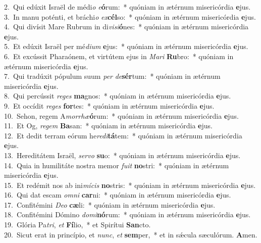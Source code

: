 {2.~}Qui edúxit Israël de médi\textit{o} \textit{e}\textbf{ó}rum:~* quóniam in ætérnum misericórdia \textbf{e}jus.\\
{3.~}In manu poténti, et bráchi\textit{o} \textit{ex}\textbf{cél}so:~* quóniam in ætérnum misericórdia \textbf{e}jus.\\
{4.~}Qui divísit Mare Rubrum in di\textit{vi}\textit{si}\textbf{ó}nes:~* quóniam in ætérnum misericórdia \textbf{e}jus.\\
{5.~}Et edúxit Israël per mé\textit{di}\textit{um} \textbf{e}jus:~* quóniam in ætérnum misericórdia \textbf{e}jus.\\
{6.~}Et excússit Pharaónem, et virtútem ejus in \textit{Ma}\textit{ri} \textbf{Ru}bro:~* quóniam in ætérnum misericórdia \textbf{e}jus.\\
{7.~}Qui tradúxit pópulum suum \textit{per} \textit{de}\textbf{sér}tum:~* quóniam in ætérnum misericórdia \textbf{e}jus.\\
{8.~}Qui percússit \textit{re}\textit{ges} \textbf{ma}gnos:~* quóniam in ætérnum misericórdia \textbf{e}jus.\\
{9.~}Et occídit \textit{re}\textit{ges} \textbf{for}tes:~* quóniam in ætérnum misericórdia \textbf{e}jus.\\
{10.~}Sehon, regem A\textit{mor}\textit{rhæ}\textbf{ó}rum:~* quóniam in ætérnum misericórdia \textbf{e}jus.\\
{11.~}Et Og, \textit{re}\textit{gem} \textbf{Ba}san:~* quóniam in ætérnum misericórdia \textbf{e}jus.\\
{12.~}Et dedit terram eórum he\textit{re}\textit{di}\textbf{tá}tem:~* quóniam in ætérnum misericórdia \textbf{e}jus.\\
{13.~}Hereditátem Israël, \textit{ser}\textit{vo} \textbf{su}o:~* quóniam in ætérnum misericórdia \textbf{e}jus.\\
{14.~}Quia in humilitáte nostra memor \textit{fu}\textit{it} \textbf{no}stri:~* quóniam in ætérnum misericórdia \textbf{e}jus.\\
{15.~}Et redémit nos ab ini\textit{mí}\textit{cis} \textbf{no}stris:~* quóniam in ætérnum misericórdia \textbf{e}jus.\\
{16.~}Qui dat escam \textit{om}\textit{ni} \textbf{car}ni:~* quóniam in ætérnum misericórdia \textbf{e}jus.\\
{17.~}Confitémini \textit{De}\textit{o} \textbf{cæ}li:~* quóniam in ætérnum misericórdia \textbf{e}jus.\\
{18.~}Confitémini Dómino \textit{do}\textit{mi}\textbf{nó}rum:~* quóniam in ætérnum misericórdia \textbf{e}jus.\\
{19.~}Glória Pa\textit{tri}, \textit{et} \textbf{Fí}lio,~* et Spirítui \textbf{San}cto.\\
{20.~}Sicut erat in princípio, et \textit{nunc}, \textit{et} \textbf{sem}per,~* et in sǽcula sæculórum. \textbf{A}men.\\
